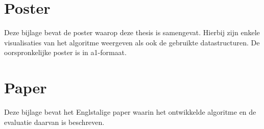 \documentclass[master=cws, masteroption=mmc]{kulemt}
\begin{document}

  \mainmatter

  
  
  
  
  
  
  
  

  \appendixpage*          %
  \appendix
  \chapter{Poster}
  Deze bijlage bevat de poster waarop deze thesis is samengevat. Hierbij zijn enkele visualisaties van
  het algoritme weergeven als ook de gebruikte datastructuren. De oorspronkelijke poster is in a1-formaat.
  \newpage
  \mbox{}
  \newpage
  

  \chapter{Paper}
  Deze bijlage bevat het Englstalige paper waarin het ontwikkelde algoritme en de evaluatie
  daarvan is beschreven.
  \newpage
  \mbox{}
  \newpage
  

  \backmatter

  
  
\end{document}
